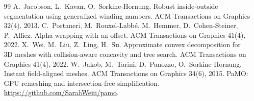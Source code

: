 \begin{thebibliography}{99}
 A.~Jacobson, L.~Kavan, O.~Sorkine-Hornung. Robust inside-outside segmentation using generalized winding numbers. ACM Transactions on Graphics 32(4), 2013.
 C.~Portaneri, M.~Rouxel-Labb\'e, M.~Hemmer, D.~Cohen-Steiner, P.~Alliez. Alpha wrapping with an offset. ACM Transactions on Graphics 41(4), 2022.
 X.~Wei, M.~Liu, Z.~Ling, H.~Su. Approximate convex decomposition for 3D meshes with collision-aware concavity and tree search. ACM Transactions on Graphics 41(4), 2022.
 W.~Jakob, M.~Tarini, D.~Panozzo, O.~Sorkine-Hornung. Instant field-aligned meshes. ACM Transactions on Graphics 34(6), 2015.
 PaMO: GPU remeshing and intersection-free simplification. \url{https://github.com/SarahWeiii/pamo}.
\end{thebibliography}


